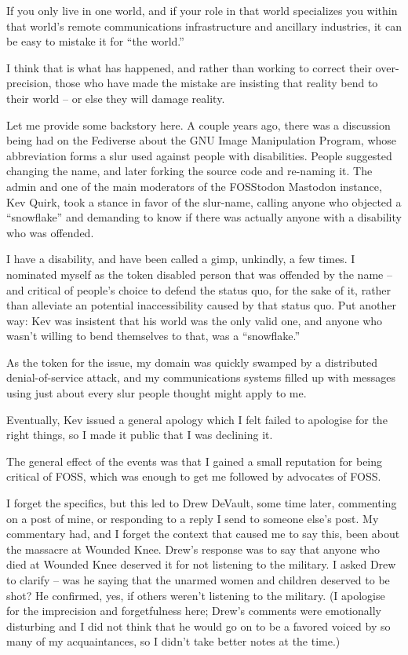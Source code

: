 \documentclass[11pt]{article}
\begin{document}
\begin{itemize}
If you only live in one world, and if your role in that world specializes you within that world’s remote communications infrastructure and ancillary industries, it can be easy to mistake it for “the world.”

I think that is what has happened, and rather than working to correct their over-precision, those who have made the mistake are insisting that reality bend to their world – or else they will damage reality.

Let me provide some backstory here. A couple years ago, there was a discussion being had on the Fediverse about the GNU Image Manipulation Program, whose abbreviation forms a slur used against people with disabilities. People suggested changing the name, and later forking the source code and re-naming it. The admin and one of the main moderators of the FOSStodon Mastodon instance, Kev Quirk, took a stance in favor of the slur-name, calling anyone who objected a “snowflake” and demanding to know if there was actually anyone with a disability who was offended.

I have a disability, and have been called a gimp, unkindly, a few times. I nominated myself as the token disabled person that was offended by the name – and critical of people’s choice to defend the status quo, for the sake of it, rather than alleviate an potential inaccessibility caused by that status quo. Put another way: Kev was insistent that his world was the only valid one, and anyone who wasn’t willing to bend themselves to that, was a “snowflake.”

As the token for the issue, my domain was quickly swamped by a distributed denial-of-service attack, and my communications systems filled up with messages using just about every slur people thought might apply to me.

Eventually, Kev issued a general apology which I felt failed to apologise for the right things, so I made it public that I was declining it.

The general effect of the events was that I gained a small reputation for being critical of FOSS, which was enough to get me followed by advocates of FOSS.

I forget the specifics, but this led to Drew DeVault, some time later, commenting on a post of mine, or responding to a reply I send to someone else’s post. My commentary had, and I forget the context that caused me to say this, been about the massacre at Wounded Knee. Drew’s response was to say that anyone who died at Wounded Knee deserved it for not listening to the military. I asked Drew to clarify – was he saying that the unarmed women and children deserved to be shot? He confirmed, yes, if others weren’t listening to the military. (I apologise for the imprecision and forgetfulness here; Drew’s comments were emotionally disturbing and I did not think that he would go on to be a favored voiced by so many of my acquaintances, so I didn’t take better notes at the time.)


\end{itemize}
\end{document}
